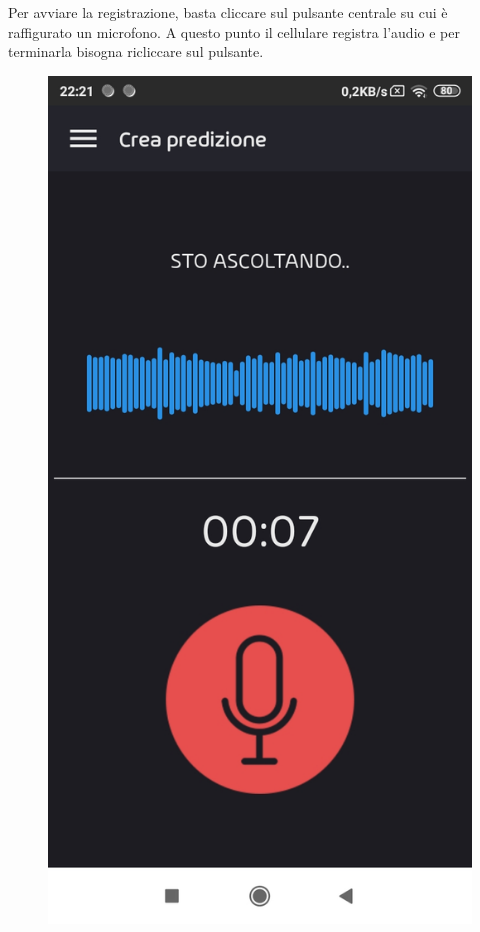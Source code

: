 \newline
Per avviare la registrazione, basta cliccare sul pulsante centrale su cui è raffigurato un microfono. A questo punto il cellulare registra l'audio e per terminarla bisogna ricliccare sul pulsante.
\begin{figure}[H]
	\centering
	\includegraphics[scale=0.20]{./images/mobile03.jpg}

\end{figure}
